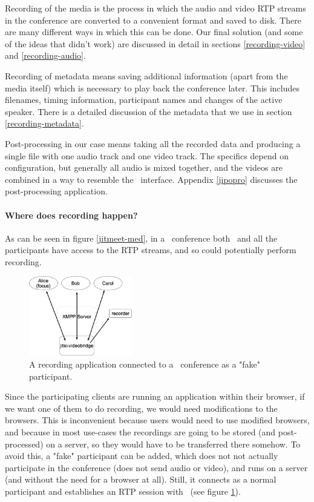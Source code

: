 \documentclass[twoside,openright,a4paper,12pt,english]{article}
\begin{document}
Recording of the media is the process in which the audio and video RTP streams
in the conference are converted to a convenient format and saved to disk. There
are many different ways in which this can be done. Our final solution (and some
of the ideas that didn't work) are discussed in detail in
sections \ref{recording-video} and \ref{recording-audio}.

Recording of metadata means saving additional information (apart from the media
itself) which is necessary to play back the conference later. This includes filenames,
timing information, participant names and changes of the active speaker. There
is a detailed discussion of the
metadata that we use in section \ref{recording-metadata}.

Post-processing in our case means taking all the recorded data and producing a
single file with one audio track and one video track. The specifics depend on
configuration, but
generally all audio is mixed together, and the videos are combined in a way to
resemble the \jm\ interface. Appendix \ref{jipopro} discusses the
post-processing application.


\paragraph*{Where does recording happen?}
As can be seen in figure \ref{jitmeet-med}, in a \jm\ conference both \jvb\ and
all the participants have access to the RTP streams, and so could potentially
perform recording.

\begin{figure}
   \centering
        \includegraphics[width=0.4\textwidth]{./pics/jm-rec.eps}
        \caption{A recording application connected to a \jm\ conference as a "fake" participant.}
   \label{jitmeet-rec}
\end{figure}

Since the participating clients are running an application within their
browser, if we want one of them to do recording, we would need modifications to
the browsers. This is inconvenient because users would need to use modified
browsers, and because in most use-cases the recordings are going to be stored
(and post-processed) on a server, so they would have to be transferred there
somehow.  To avoid this, a "fake" participant can
be added, which does not not actually participate in the conference
(does not send audio or video), and runs on a server (and without the need for a browser at all). Still, it
connects as a normal participant and establishes an RTP session with \jvb\ (see
figure \ref{jitmeet-rec}).
\end{document}
